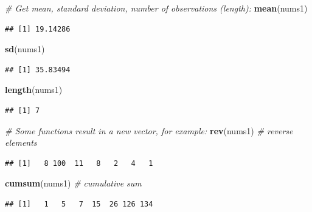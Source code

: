 \documentclass[]{book}
\newenvironment{Shaded}{\begin{snugshade}}{\end{snugshade}}
\newcommand{\CommentTok}[1]{\textcolor[rgb]{0.56,0.35,0.01}{\textit{#1}}}
\newcommand{\KeywordTok}[1]{\textcolor[rgb]{0.13,0.29,0.53}{\textbf{#1}}}
\newcommand{\NormalTok}[1]{#1}
\begin{document}
\begin{Shaded}
\begin{Highlighting}[]
\CommentTok{# Get mean, standard deviation, number of observations (length):}
\KeywordTok{mean}\NormalTok{(nums1)}
\end{Highlighting}
\end{Shaded}

\begin{verbatim}
## [1] 19.14286
\end{verbatim}

\begin{Shaded}
\begin{Highlighting}[]
\KeywordTok{sd}\NormalTok{(nums1)}
\end{Highlighting}
\end{Shaded}

\begin{verbatim}
## [1] 35.83494
\end{verbatim}

\begin{Shaded}
\begin{Highlighting}[]
\KeywordTok{length}\NormalTok{(nums1)}
\end{Highlighting}
\end{Shaded}

\begin{verbatim}
## [1] 7
\end{verbatim}

\begin{Shaded}
\begin{Highlighting}[]
\CommentTok{# Some functions result in a new vector, for example:}
\KeywordTok{rev}\NormalTok{(nums1)  }\CommentTok{# reverse elements}
\end{Highlighting}
\end{Shaded}

\begin{verbatim}
## [1]   8 100  11   8   2   4   1
\end{verbatim}

\begin{Shaded}
\begin{Highlighting}[]
\KeywordTok{cumsum}\NormalTok{(nums1)  }\CommentTok{# cumulative sum}
\end{Highlighting}
\end{Shaded}

\begin{verbatim}
## [1]   1   5   7  15  26 126 134
\end{verbatim}
\end{document}
